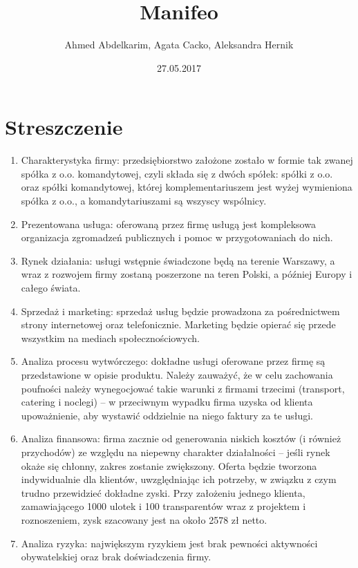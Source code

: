 \documentclass{article}
\title{\Huge{Manifeo}\\ %
}
\author{\large{Ahmed Abdelkarim, Agata Cacko, Aleksandra Hernik}}
\date{\large{27.05.2017}}
\begin{document}
\maketitle
\vspace{2cm}
\tableofcontents
\newpage




\section{Streszczenie}
\begin{enumerate}
\item Charakterystyka firmy: przedsiębiorstwo założone zostało w formie tak zwanej spółka z o.o. komandytowej, czyli składa się z dwóch spółek: spółki z o.o. oraz spółki komandytowej, której komplementariuszem jest wyżej wymieniona spółka z o.o., a komandytariuszami są wszyscy wspólnicy.
\item Prezentowana usługa: oferowaną przez firmę usługą jest kompleksowa organizacja zgromadzeń publicznych i pomoc w przygotowaniach do nich.
\item Rynek działania: usługi wstępnie świadczone będą na terenie Warszawy, a wraz z rozwojem firmy zostaną poszerzone na teren Polski, a później Europy i całego świata.
\item Sprzedaż i marketing: sprzedaż usług będzie prowadzona za pośrednictwem strony internetowej oraz telefonicznie. Marketing będzie opierać się przede wszystkim na mediach społecznościowych. 
\item Analiza procesu wytwórczego: dokładne usługi oferowane przez firmę są przedstawione w opisie produktu. Należy zauważyć, że w celu zachowania poufności należy wynegocjować takie warunki z firmami trzecimi (transport, catering i noclegi) -- w przeciwnym wypadku firma uzyska od klienta upoważnienie, aby wystawić oddzielnie na niego faktury za te usługi. 
\item Analiza finansowa: firma zacznie od generowania niskich kosztów (i również przychodów) ze względu na niepewny charakter działalności -- jeśli rynek okaże się chłonny, zakres zostanie zwiększony. Oferta będzie tworzona indywidualnie dla klientów, uwzględniając ich potrzeby, w związku z czym trudno przewidzieć dokładne zyski. Przy założeniu jednego klienta, zamawiającego 1000 ulotek i 100 transparentów wraz z projektem i roznoszeniem, zysk szacowany jest na około 2578 zł netto.
\item Analiza ryzyka: największym ryzykiem jest brak pewności aktywności obywatelskiej oraz brak doświadczenia firmy.
\end{enumerate}
\end{document}
